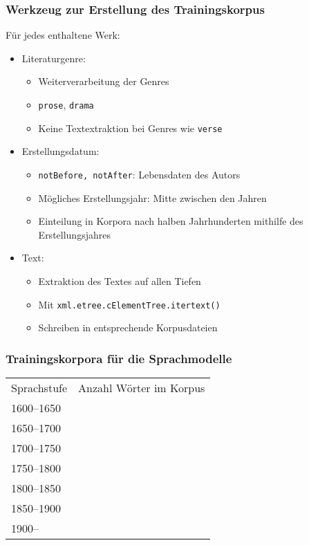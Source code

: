 \documentclass[t]{beamer} %
\begin{document}
\begin{frame}
  \frametitle{Werkzeug zur Erstellung des Trainingskorpus}
  Für jedes enthaltene Werk:
  
  \begin{itemize}
  \item Literaturgenre:
    \begin{itemize}
    \item Weiterverarbeitung der Genres \item \texttt{prose}, \texttt{drama} 
    \item Keine Textextraktion bei Genres wie \texttt{verse}
    \end{itemize}
    \vspace*{1ex}
    \pause

  \item Erstellungsdatum:
    \begin{itemize}
    \item \texttt{notBefore, notAfter}: Lebensdaten des Autors
    \item Mögliches Erstellungsjahr: Mitte zwischen den Jahren 
    \item Einteilung in Korpora nach halben Jahrhunderten mithilfe des Erstellungsjahres
    \end{itemize}
    \vspace*{1ex}
    \pause
    
  \item Text:
    \begin{itemize}
    \item Extraktion des Textes auf allen Tiefen
    \item Mit \texttt{xml.etree.cElementTree.itertext()}
    \item Schreiben in entsprechende Korpusdateien
    \end{itemize}
  \end{itemize}
\end{frame}

\begin{frame}
  \frametitle{Trainingskorpora für die Sprachmodelle}
  \begin{tabular}{ll}
  Sprachstufe & Anzahl Wörter im Korpus
  \vspace*{1ex}\\
  1600--1650 & \\
  1650--1700 & \\
  1700--1750 & \\
  1750--1800 & \\
  1800--1850 & \\
  1850--1900 & \\
  1900--     & 
  \end{tabular}
\end{frame}
\end{document}

